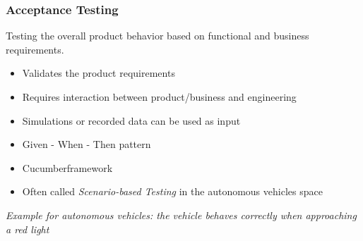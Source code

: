 \begin{frame}
\frametitle{Acceptance Testing}
Testing the overall product behavior based on functional and business
requirements.
\begin{itemize}
    \item Validates the product requirements
    \item Requires interaction between product/business and engineering
    \item Simulations or recorded data can be used as input
    \item Given - When - Then pattern
    \item Cucumber\footnotemark[1] framework
    \item Often called \emph{Scenario-based Testing} in the autonomous vehicles
        space
\end{itemize}
\vspace{0.25cm}
\emph{Example for autonomous vehicles: the vehicle behaves correctly when
approaching a red light}
\end{frame}

